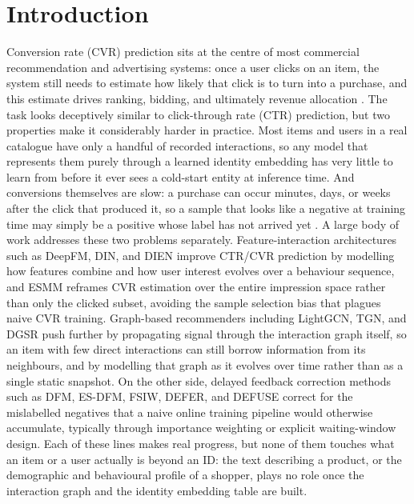 \documentclass{uclthesis}
\begin{document}
\makethesistitle
{}
\tableofcontents
\clearpage
\listoffigures
\clearpage
\listoftables
\clearpage
\chapter{Introduction}
Conversion rate (CVR) prediction sits at the centre of most commercial recommendation and advertising systems: once a user clicks on an item, the system still needs to estimate how likely that click is to turn into a purchase, and this estimate drives ranking, bidding, and ultimately revenue allocation \citep{ma2018esmm}. The task looks deceptively similar to click-through rate (CTR) prediction, but two properties make it considerably harder in practice. Most items and users in a real catalogue have only a handful of recorded interactions, so any model that represents them purely through a learned identity embedding has very little to learn from before it ever sees a cold-start entity at inference time. And conversions themselves are slow: a purchase can occur minutes, days, or weeks after the click that produced it, so a sample that looks like a negative at training time may simply be a positive whose label has not arrived yet \citep{chapelle2014modeling}.
A large body of work addresses these two problems separately. Feature-interaction architectures such as DeepFM, DIN, and DIEN \citep{guo2017deepfm,zhou2018din,zhou2019dien} improve CTR/CVR prediction by modelling how features combine and how user interest evolves over a behaviour sequence, and ESMM \citep{ma2018esmm} reframes CVR estimation over the entire impression space rather than only the clicked subset, avoiding the sample selection bias that plagues naive CVR training. Graph-based recommenders including LightGCN, TGN, and DGSR \citep{he2020lightgcn,rossi2020tgn,zhang2022dgsr} push further by propagating signal through the interaction graph itself, so an item with few direct interactions can still borrow information from its neighbours, and by modelling that graph as it evolves over time rather than as a single static snapshot. On the other side, delayed feedback correction methods such as DFM, ES-DFM, FSIW, DEFER, and DEFUSE \citep{chapelle2014modeling,yang2021capturing,yasui2020feedback,gu2021defer,chen2022defuse,wang2023unbiased} correct for the mislabelled negatives that a naive online training pipeline would otherwise accumulate, typically through importance weighting or explicit waiting-window design. Each of these lines makes real progress, but none of them touches what an item or a user actually is beyond an ID: the text describing a product, or the demographic and behavioural profile of a shopper, plays no role once the interaction graph and the identity embedding table are built.
\end{document}
